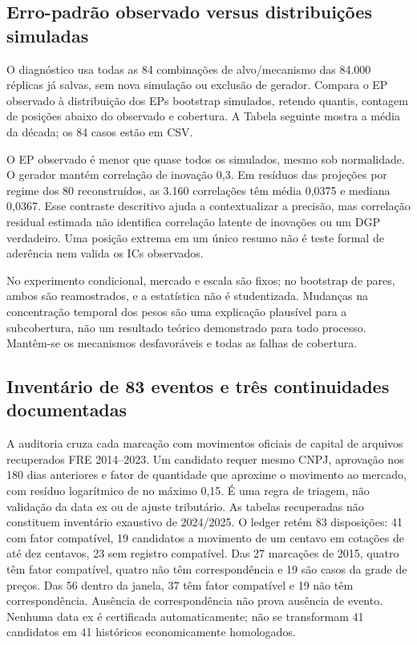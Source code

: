 \documentclass[12 pt]{article}
\begin{document}
\subsection{Erro-padrão observado versus distribuições simuladas}
O diagnóstico usa todas as 84 combinações de alvo/mecanismo das 84.000
réplicas já salvas, sem nova simulação ou exclusão de gerador.
Compara o EP observado à distribuição dos EPs bootstrap simulados,
retendo quantis, contagem de posições abaixo do observado e cobertura.
A Tabela seguinte mostra a média da década; os 84 casos estão em CSV.
\begin{table}[htbp]\centering\scriptsize
\caption{Distribuição do EP simulado, média da década. $k/R$: EP simulado
menor ou igual ao observado. Quantis não são ICs da cobertura observada.}

\end{table}
O EP observado é menor que quase todos os simulados, mesmo sob normalidade.
O gerador mantém correlação de inovação 0,3. Em resíduos das projeções
por regime dos 80 reconstruídos, as 3.160 correlações têm média 0,0375
e mediana 0,0367. Esse contraste descritivo ajuda a contextualizar a
precisão, mas correlação residual estimada não identifica correlação
latente de inovações ou um DGP verdadeiro. Uma posição extrema em um
único resumo não é teste formal de aderência nem valida os ICs observados.

No experimento condicional, mercado e escala são fixos; no bootstrap de
pares, ambos são reamostrados, e a estatística não é studentizada.
Mudanças na concentração temporal dos pesos são uma explicação plausível
para a subcobertura, não um resultado teórico demonstrado para todo processo.
Mantêm-se os mecanismos desfavoráveis e todas as falhas de cobertura.

\subsection{Inventário de 83 eventos e três continuidades documentadas}
A auditoria cruza cada marcação com movimentos oficiais de capital de
arquivos recuperados FRE 2014--2023. Um candidato requer mesmo CNPJ,
aprovação nos 180 dias anteriores e fator de quantidade que aproxime o
movimento ao mercado, com resíduo logarítmico de no máximo 0,15.
É uma regra de triagem, não validação da data ex ou de ajuste tributário.
As tabelas recuperadas não constituem inventário exaustivo de 2024/2025.
O ledger retém 83 disposições: 41 com fator compatível, 19 candidatos a
movimento de um centavo em cotações de até dez centavos, 23 sem registro
compatível. Das 27 marcações de 2015, quatro têm fator compatível, quatro
não têm correspondência e 19 são casos da grade de preços. Das 56 dentro
da janela, 37 têm fator compatível e 19 não têm correspondência. Ausência
de correspondência não prova ausência de evento. Nenhuma data ex é
certificada automaticamente; não se transformam 41 candidatos em 41
históricos economicamente homologados.
\end{document}
